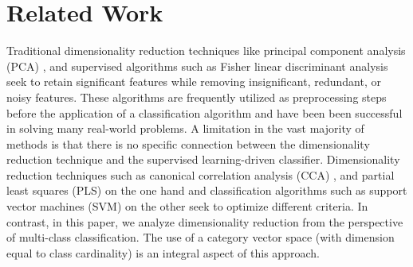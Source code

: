 
\section{Related Work\label{Related-Work}}

Traditional dimensionality reduction techniques like principal component
analysis (PCA) \citep{Jolliffe1986}, and supervised algorithms such
as Fisher linear discriminant analysis \citep{fisher1936use} seek
to retain significant features while removing insignificant, redundant,
or noisy features. These algorithms are frequently utilized as preprocessing
steps before the application of a classification algorithm and have
been been successful in solving many real-world problems. A limitation
in the vast majority of methods is that there is no specific connection
between the dimensionality reduction technique and the supervised
learning-driven classifier. Dimensionality reduction techniques such
as canonical correlation analysis (CCA) \citep{Hotelling1933}, and
partial least squares (PLS) \citep{Arenas-GarciaPetersenHansen2007}
on the one hand and classification algorithms such as support vector
machines (SVM) \citep{Vapnik1998} on the other seek to optimize different
criteria. In contrast, in this paper, we analyze dimensionality reduction
from the perspective of multi-class classification. The use of a category
vector space (with dimension equal to class cardinality) is an integral
aspect of this approach.

